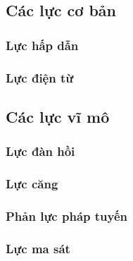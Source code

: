 \subsection{Các lực cơ bản}
\begin{frame}
    \frametitle{Lực hấp dẫn}
\end{frame}
\begin{frame}
\frametitle{Lực điện từ}
\end{frame}
\subsection{Các lực vĩ mô}
\begin{frame}
    \frametitle{Lực đàn hồi}
\end{frame}
\begin{frame}
    \frametitle{Lực căng}
\end{frame}
\begin{frame}
    \frametitle{Phản lực pháp tuyến}
\end{frame}
\begin{frame}
    \frametitle{Lực ma sát}
\end{frame}
